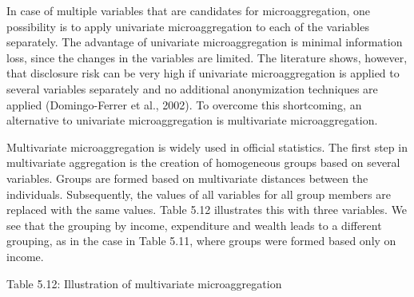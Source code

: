 \documentclass[letterpaper,10pt,english]{sphinxmanual}
\begin{document}
In case of multiple variables that are candidates for microaggregation,
one possibility is to apply univariate microaggregation to each of the
variables separately. The advantage of univariate microaggregation is
minimal information loss, since the changes in the variables are
limited. The literature shows, however, that disclosure risk can be very
high if univariate microaggregation is applied to several variables
separately and no additional anonymization techniques are applied
(Domingo-Ferrer et al., 2002). To overcome this shortcoming, an
alternative to univariate microaggregation is multivariate
microaggregation.

Multivariate microaggregation is widely used in official statistics. The
first step in multivariate aggregation is the creation of homogeneous
groups based on several variables. Groups are formed based on
multivariate distances between the individuals. Subsequently, the values
of all variables for all group members are replaced with the same
values. Table 5.12 illustrates this with three variables. We see that
the grouping by income, expenditure and wealth leads to a different
grouping, as in the case in Table 5.11, where groups were formed based
only on income.

Table 5.12: Illustration of multivariate microaggregation
\end{document}
